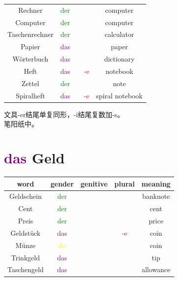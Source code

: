 \begin{center}
\begin{tabular} {|c|c|c|c|c|}
        Rechner         & \textcolor{green}{der}  &          &                     & computer          \\
        Computer        & \textcolor{green}{der}  &          &                     & computer          \\
        Taschenrechner  & \textcolor{green}{der}  &          &                     & calculator        \\
        \hline
        Papier          & \textcolor{purple}{das} &          &                     & paper             \\
        Wörterbuch      & \textcolor{purple}{das} &          &                     & dictionary        \\
        Heft            & \textcolor{purple}{das} &          & \textcolor{red}{-e} & notebook          \\
        Zettel          & \textcolor{green}{der}  &          &                     & note              \\
        Spiralheft      & \textcolor{purple}{das} &          & \textcolor{red}{-e} & spiral notebook   \\
        \hline
    \end{tabular}
\end{center}

文具-er结尾单复同形，-i结尾复数加-s。\\
笔阳纸中。\\

\section{\textcolor{purple}{das} Geld}
\begin{center}
    \begin{tabular} {|c|c|c|c|c|}
        \hline
        \rowcolor{gray}
        word        & gender                  & genitive & plural              & meaning   \\
        \hline
        Geldschein  & \textcolor{green}{der}  &          &                     & banknote  \\
        Cent        & \textcolor{green}{der}  &          &                     & cent      \\
        Preis       & \textcolor{green}{der}  &          &                     & price     \\
        Geldstück   & \textcolor{purple}{das} &          & \textcolor{red}{-e} & coin      \\
        Münze       & \textcolor{yellow}{die} &          &                     & coin      \\
        Trinkgeld   & \textcolor{purple}{das} &          &                     & tip       \\
        Taschengeld & \textcolor{purple}{das} &          &                     & allowance \\
    \end{tabular}
\end{center}

